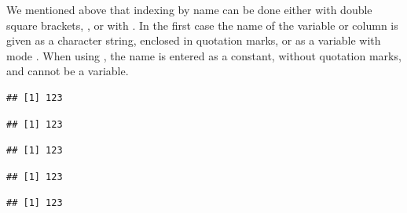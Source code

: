 \documentclass[krantz2]{krantz}\usepackage{knitr}
\begin{document}
\begin{warningbox}
We mentioned above that indexing by name can be done either with double square brackets, \Roperator{[[]]}, or with \Roperator{\$}. In the first case the name of the variable or column is given as a character string, enclosed in quotation marks, or as a variable with mode . When using \Roperator{\$}, the name is entered as a constant, without quotation marks, and cannot be a variable.

\begin{knitrout}\footnotesize
{}\color{fgcolor}\begin{kframe}
\begin{alltt}
 \hlkwb{<-} \hlstd{(} \hlstd{=} \hlstd{,}  \hlstd{=} \hlstd{)}
\hlstd{x.list[[}\hlstd{]]}
\end{alltt}
\begin{verbatim}
## [1] 123
\end{verbatim}
\begin{alltt}
 \hlkwb{<-} 
\end{alltt}
\begin{verbatim}
## [1] 123
\end{verbatim}
\end{kframe}
\end{knitrout}

\begin{knitrout}\footnotesize
{}\color{fgcolor}\begin{kframe}
\begin{alltt}
\hlopt{$}
\end{alltt}
\begin{verbatim}
## [1] 123
\end{verbatim}
\begin{alltt}
\hlopt{$}
\end{alltt}
\begin{verbatim}
## [1] 123
\end{verbatim}
\begin{alltt}
\hlopt{$}
\end{alltt}
\begin{verbatim}
## [1] 123
\end{verbatim}
\end{kframe}
\end{knitrout}


\end{warningbox}
\end{document}
